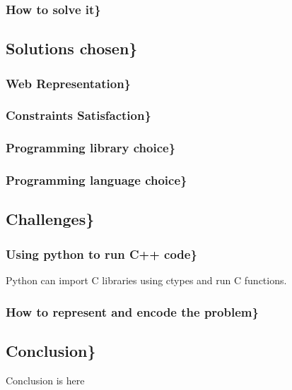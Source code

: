 \documentclass[11pt]{article}
\begin{document}
\subsubsection{How to solve it\}}
\label{sec-3_1_2}
\subsection{Solutions chosen\}}
\label{sec-3_2}
\subsubsection{Web Representation\}}
\label{sec-3_2_1}
\subsubsection{Constraints Satisfaction\}}
\label{sec-3_2_2}
\subsubsection{Programming library choice\}}
\label{sec-3_2_3}
\subsubsection{Programming language choice\}}
\label{sec-3_2_4}
\subsection{Challenges\}}
\label{sec-3_3}
\subsubsection{Using python to run C++ code\}}
\label{sec-3_3_1}

Python can import C libraries using ctypes and run C functions.
\subsubsection{How to represent and encode the problem\}}
\label{sec-3_3_2}
\subsection{Conclusion\}}
\label{sec-3_4}

Conclusion is here
\end{document}

